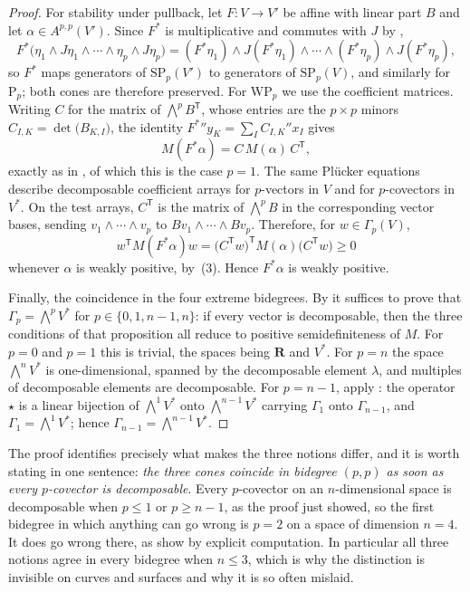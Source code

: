 \begin{proof}
For stability under pullback, let $F:V\to V'$ be affine with linear part $B$
and let $\alpha\in A^{p,p}(V')$.  Since $F^*$ is multiplicative and commutes
with $J$ by ,
\[
 F^*\bigl(\eta_1\wedge J\eta_1\wedge\cdots\wedge\eta_p\wedge J\eta_p\bigr)
 =(F^*\eta_1)\wedge J(F^*\eta_1)\wedge\cdots
   \wedge(F^*\eta_p)\wedge J(F^*\eta_p),
\]
so $F^*$ maps generators of $\mathrm{SP}_p(V')$ to generators of
$\mathrm{SP}_p(V)$, and similarly for $\mathrm{P}_p$; both cones are
therefore preserved.  For $\mathrm{WP}_p$ we use the coefficient matrices.
Writing $C$ for the matrix of $\bigwedge^pB^{\mathsf T}$, whose entries are
the $p\times p$ minors $C_{I,K}=\det\bigl(B_{K,I}\bigr)$, the identity
$F^*\dprime y_K=\sum_IC_{I,K}\dprime x_I$ gives
\[
 M(F^*\alpha)=C\,M(\alpha)\,C^{\mathsf T},
\]
exactly as in , of which this is the case
$p=1$.  The same Pl\"ucker equations describe decomposable coefficient arrays
for $p$-vectors in $V$ and for $p$-covectors in $V^*$.  On the test arrays,
$C^{\mathsf T}$ is the matrix of $\bigwedge^pB$ in the corresponding
vector bases, sending
$v_1\wedge\cdots\wedge v_p$ to $Bv_1\wedge\cdots\wedge Bv_p$.  Therefore, for
$w\in\Gamma_p(V)$,
\[
 w^{\mathsf T}M(F^*\alpha)w
 =\bigl(C^{\mathsf T}w\bigr)^{\mathsf T}M(\alpha)\bigl(C^{\mathsf T}w\bigr)
 \geq0
\]
whenever $\alpha$ is weakly positive, by
\,(3).  Hence $F^*\alpha$ is weakly
positive.

Finally, the coincidence in the four extreme bidegrees.  By
 it suffices to prove that
$\Gamma_p=\bigwedge^pV^*$ for $p\in\{0,1,n-1,n\}$: if every vector is
decomposable, then the three conditions of that proposition all reduce to
positive semidefiniteness of $M$.  For $p=0$ and $p=1$ this is trivial, the
spaces being $\mathbf R$ and $V^*$.  For $p=n$ the space
$\bigwedge^nV^*$ is one-dimensional, spanned by the decomposable element
$\lambda$, and multiples of decomposable elements are decomposable.  For
$p=n-1$, apply : the operator $\star$ is a
linear bijection of $\bigwedge^1V^*$ onto $\bigwedge^{n-1}V^*$ carrying
$\Gamma_1$ onto $\Gamma_{n-1}$, and $\Gamma_1=\bigwedge^1V^*$; hence
$\Gamma_{n-1}=\bigwedge^{n-1}V^*$.
\end{proof}

The proof identifies precisely what makes the three notions differ, and it is
worth stating in one sentence: \emph{the three cones coincide in bidegree
$(p,p)$ as soon as every $p$-covector is decomposable}.  Every $p$-covector
on an $n$-dimensional space is decomposable when $p\leq1$ or $p\geq n-1$, as
the proof just showed, so the first bidegree in which anything can go wrong
is $p=2$ on a space of dimension $n=4$.  It does go wrong there, as
 show by explicit
computation.  In particular all three notions agree in every bidegree when
$n\leq3$, which is why the distinction is invisible on curves and surfaces
and why it is so often mislaid.

